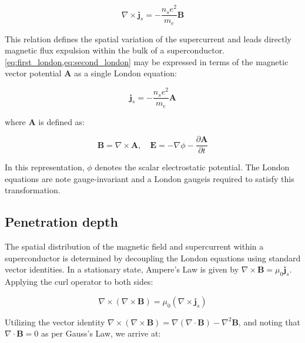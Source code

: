 \begin{equation}\label{eq:second_london}
    \nabla \times \mathbf{j}_s = -\frac{n_s e^2}{m_e} \mathbf{B}
\end{equation}

This relation defines the spatial variation of the supercurrent and leads directly magnetic flux expulsion within the bulk of a superconductor. \cref{eq:first_london,eq:second_london} may be expressed in terms of the magnetic vector potential $\mathbf{A}$ as a single London equation:

\begin{equation}
    \mathbf{j}_s = -\frac{n_s e^2}{m_e} \mathbf{A}
\end{equation}

where $\mathbf{A}$ is defined as:

\begin{equation}
    \mathbf{B} = \nabla \times \mathbf{A}, \quad \mathbf{E} = -\nabla \phi - \frac{\partial \mathbf{A}}{\partial t}
\end{equation}

In this representation, $\phi$ denotes the scalar electrostatic potential. The London equations are note gauge-invariant and a London gauge\footnotemark  is required to satisfy this transformation.


\subsection*{Penetration depth}

The spatial distribution of the magnetic field and supercurrent within a superconductor is determined by decoupling the London equations using standard vector identities. In a stationary state, Ampere’s Law is given by $\nabla \times \mathbf{B} = \mu_0 \mathbf{j}_s$. Applying the curl operator to both sides:

\begin{equation}
    \nabla \times (\nabla \times \mathbf{B}) = \mu_0 (\nabla \times \mathbf{j}_s)
\end{equation}

Utilizing the vector identity $\nabla \times (\nabla \times \mathbf{B}) = \nabla(\nabla \cdot \mathbf{B}) - \nabla^2 \mathbf{B}$, and noting that $\nabla \cdot \mathbf{B} = 0$ as per Gauss’s Law, we arrive at:

